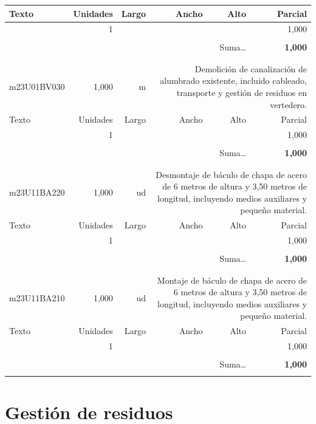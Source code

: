 \documentclass{book}%
\begin{document}
\begin{longtable}{lrrrrr}
Texto&Unidades&Largo&Ancho&Alto&Parcial\\%
\hline%
\multicolumn{1}{p{3.5cm}}{ }&1&&&&     1,000\\%
&&&&&\\%
\multicolumn{5}{r}{Suma\ldots}&\textbf{     1,000}\\%
\hline%
&&&&&\\%
&&&&&\\%
m23U01BV030&     1,000& m&\multicolumn{3}{p{6cm}}{\scriptsize Demolición de canalización de alumbrado existente, incluido cableado, transporte y gestión de residuos en vertedero.\normalsize}\\%
Texto&Unidades&Largo&Ancho&Alto&Parcial\\%
\hline%
\multicolumn{1}{p{3.5cm}}{ }&1&&&&     1,000\\%
&&&&&\\%
\multicolumn{5}{r}{Suma\ldots}&\textbf{     1,000}\\%
\hline%
&&&&&\\%
&&&&&\\%
m23U11BA220&     1,000& ud&\multicolumn{3}{p{6cm}}{\scriptsize Desmontaje de báculo de chapa de acero de 6 metros de altura y 3,50 metros de longitud, incluyendo medios auxiliares y pequeño material.\normalsize}\\%
Texto&Unidades&Largo&Ancho&Alto&Parcial\\%
\hline%
\multicolumn{1}{p{3.5cm}}{ }&1&&&&     1,000\\%
&&&&&\\%
\multicolumn{5}{r}{Suma\ldots}&\textbf{     1,000}\\%
\hline%
&&&&&\\%
&&&&&\\%
m23U11BA210&     1,000& ud&\multicolumn{3}{p{6cm}}{\scriptsize Montaje de báculo de chapa de acero de 6 metros de altura y 3,50 metros de longitud, incluyendo medios auxiliares y pequeño material.\normalsize}\\%
Texto&Unidades&Largo&Ancho&Alto&Parcial\\%
\hline%
\multicolumn{1}{p{3.5cm}}{ }&1&&&&     1,000\\%
&&&&&\\%
\multicolumn{5}{r}{Suma\ldots}&\textbf{     1,000}\\%
\hline%
&&&&&\\%
\end{longtable}%
\newpage

%
\section{Gestión de residuos}%
\end{document}
